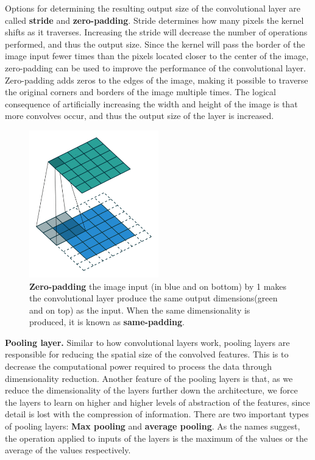\documentclass[english, bibtex]{kththesis}
\begin{document}
Options for determining the resulting output size of the convolutional layer are called \textbf{stride} and \textbf{zero-padding}. Stride determines how many pixels the kernel shifts as it traverses. Increasing the stride will decrease the number of operations performed, and thus the output size. Since the kernel will pass the border of the image input fewer times than the pixels located closer to the center of the image, zero-padding can be used to improve the performance of the convolutional layer. Zero-padding adds zeros to the edges of the image, making it possible to traverse the original corners and borders of the image multiple times. The logical consequence of artificially increasing the width and height of the image is that more convolves occur, and thus the output size of the layer is increased. 

\begin{figure}[H]
  \begin{center}
    \includegraphics[width=0.5\textwidth]{figures/padding.png}
  \end{center}
  \caption{\textbf{Zero-padding} the image input (in blue and on bottom) by 1 makes the convolutional layer produce the same output dimensions(green and on top) as the input. When the same dimensionality is produced, it is known as \textbf{same-padding}\cite{Kang2020DeepCN}.}
  \label{fig:padding}
\end{figure}

\textbf{Pooling layer.} Similar to how convolutional layers work, pooling layers are responsible for reducing the spatial size of the convolved features. This is to decrease the computational power required to process the data through dimensionality reduction. Another feature of the pooling layers is that, as we reduce the dimensionality of the layers further down the architecture, we force the layers to learn on higher and higher levels of abstraction of the features, since detail is lost with the compression of information. There are two important types of pooling layers: \textbf{Max pooling} and \textbf{average pooling}. As the names suggest, the operation applied to inputs of the layers is the maximum of the values or the average of the values respectively. 
\end{document}
